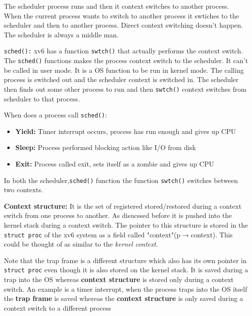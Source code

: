 \documentclass[12pt]{article}
\newcommand{\tbox}[1]{\noindent\fbox{\parbox{\textwidth}{#1}}}
\begin{document}
 The scheduler process runs and then it context switches to another process. When the current process wants to switch to another process it swtiches to the scheduler and then to another process. 
 Direct context switching doesn't happen. The scheduler is always a middle man.

{\texttt{sched():}}  xv6 has a function \texttt{swtch()} that actually performs the context switch. The \texttt{sched()} functions makes the process context switch to the scheduler. It can't be called in user mode. It
is a OS function to be run in kernel mode. The calling process is switched out and the scheduler context is switched in. The scheduler then finds out 
some other process to run and then \texttt{swtch()} context switches from scheduler to that process. 

When does a process call \texttt{sched()}:
\begin{itemize}[topsep=0pt, partopsep=0pt, itemsep=0pt, parsep=0pt]
    \item \textbf{Yield:} Timer interrupt occurs, process has run enough and gives up CPU
    \item \textbf{Sleep:} Process performed blocking action like I/O from disk
    \item \textbf{Exit:} Process called exit, sets itself as a zombie and gives up CPU
\end{itemize}

In both the scheduler,\texttt{sched()} function the function \texttt{swtch()} switches between two contexts.

\textbf{Context structure:} It is the set of registered stored/restored during a context switch from one process to another. As disucssed before it is pushed into the kernel stack during a context switch.
The pointer to this structure is stored in the \texttt{struct proc} of the xv6 system as a field called "context"(p$\rightarrow$context). This could be thought of as similar to the \textit{kernel context}.


Note that the trap frame is a different structure which also has its own pointer in \texttt{struct proc} even though it is also stored on the kernel stack. It is saved during a trap into the OS whereas \textbf{context structure}
is stored only during a context switch. An example is a timer interrupt, when the process traps into the OS itself the \textbf{trap frame} is saved whereas the \textbf{context structure} is only saved during a 
context switch to a different process

\noindent\tbox{
    \begin{center}
    \textbf{\Huge Lecture 9}
    \end{center}
}
\\
\end{document}
